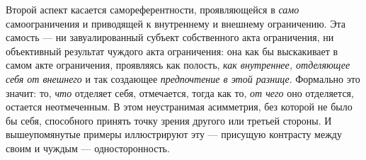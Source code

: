 \documentclass[12pt]{book}
\begin{document}
Второй аспект касается самореферентности, проявляющейся в \textit{само} самоограничения и приводящей к внутреннему и внешнему ограничению. Эта самость --- ни завуалированный субъект собственного акта ограничения, ни объективный результат чуждого акта ограничения: она как бы выскакивает в самом акте ограничения, проявляясь как полость, \textit{как внутреннее, отделяющее себя от внешнего} и так создающее \textit{предпочтение в этой разнице}. Формально это значит: то, \textit{что} отделяет себя, отмечается, тогда как то, \textit{от чего} оно отделяется, остается неотмеченным. В этом неустранимая асимметрия, без которой не было бы себя, способного принять точку зрения другого или третьей стороны. И вышеупомянутые примеры иллюстрируют эту --- присущую контрасту между своим и чуждым --- односторонность.
\end{document}
